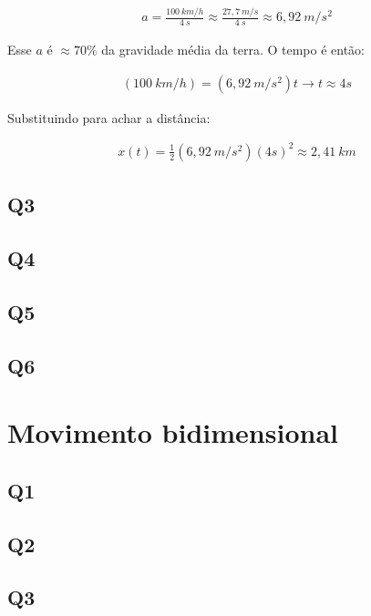 \documentclass{antiquebook}
\begin{document}
	\begin{align*}
		a = \frac{100 \ \si{km/h}}{4 \ \si{s}} \approx \frac{27,7 \ \si{m/s}}{4 \ \si{s}} \approx 6,92 \ \si{m/s^2} 
	\end{align*}

	Esse $a$ é $\approx 70\%$ da gravidade média da terra. O tempo é
	então:

	\begin{align*}
		(100 \ \si{km/h}) = (6,92 \ \si{m/s^2})t \rightarrow t \approx 4 \si{s}
	\end{align*}

	Substituindo para achar a distância:

	\begin{align*}
		x(t) = \frac{1}{2}(6,92 \ \si{m/s^2})(4\si{s})^2 \approx 2,41 \ \si{km}
	\end{align*}


	\section{Q3}



	\section{Q4}

	\section{Q5}

	\section{Q6}

	\chapter{Movimento bidimensional}

	\section{Q1}

	\section{Q2}

	\section{Q3}
\end{document}
